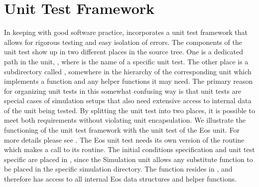 \section{Unit Test Framework}
\label{Sec: unitTest }
In keeping with good software practice, \flashx incorporates a unit
test framework that allows for rigorous testing and easy isolation of
errors. The components of the unit test show up in two different
places in the \flashx source tree. One is a dedicated path in the
 unit,
, where 
 is the name of a specific unit test. The other place is a
subdirectory called , somewhere in the hierarchy of the
corresponding unit which implements a function 
and any helper functions it may need. The primary reason for organizing unit
tests in this somewhat confusing way is that unit tests are special cases of 
simulation setups that also need extensive access to internal data of the unit
being tested. By splitting the unit
test into two places, it is possible to meet both requirements without
violating unit encapsulation. We illustrate the functioning of the
unit test framework with the unit test of the \unit{Eos} unit. For more
details please see . The \unit{Eos} unit test needs its
own version of the routine  which makes a
call to its  routine. The initial conditions
specification and unit test specific  are
placed in , since
the \unit{Simulation} unit allows any substitute \flashx function to be placed in
the specific simulation directory. The function 
resides in , and therefore has access to all
internal \unit{Eos} data structures and helper functions.

